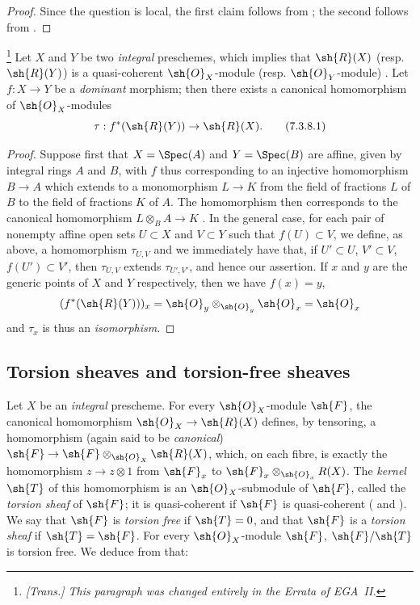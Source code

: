 \begin{proof}
Since the question is local, the first claim follows from ; the second follows from .
\end{proof}

\begin{env}[7.3.8]
\label{I.7.3.8}
\footnote{\emph{[Trans.] This paragraph was changed entirely in the Errata of EGA~II.}}
Let $X$ and $Y$ be two \emph{integral} preschemes, which implies that $\sh{R}(X)$ (resp. $\sh{R}(Y)$) is a quasi-coherent $\sh{O}_X$-module (resp. $\sh{O}_Y$-module) .
Let $f:X\to Y$ be a \emph{dominant} morphism; then there exists a canonical homomorphism of $\sh{O}_X$-modules
\[
\label{I.7.3.8.1}
  \tau:f^*(\sh{R}(Y))\to\sh{R}(X).
  \tag{7.3.8.1}
\]
\end{env}

\begin{proof}
Suppose first that $X=\Spec(A)$ and $Y=\Spec(B)$ are affine, given by integral rings $A$ and $B$, with $f$ thus corresponding to an injective homomorphism $B\to A$ which extends to a monomorphism $L\to K$ from the field of fractions $L$ of $B$ to the field of fractions $K$ of $A$.
The homomorphism  then corresponds to the canonical homomorphism $L\otimes_B A\to K$ .
In the general case, for each pair of nonempty affine open sets $U\subset X$ and $V\subset Y$ such that $f(U)\subset V$, we define, as above, a homomorphism $\tau_{U,V}$ and we immediately have that, if $U'\subset U$, $V'\subset V$, $f(U')\subset V'$, then $\tau_{U,V}$ extends $\tau_{U',V'}$, and hence our assertion.
If $x$ and $y$ are the generic points of $X$ and $Y$ respectively, then we have $f(x)=y$,
\[
  (f^*(\sh{R}(Y)))_x=\sh{O}_y\otimes_{\sh{O}_y}\sh{O}_x=\sh{O}_x
\]
 and $\tau_x$ is thus an \emph{isomorphism}.
\end{proof}

\subsection{Torsion sheaves and torsion-free sheaves}
\label{subsection:I.7.4}
\label{I.7.4}

\begin{env}[7.4.1]
\label{I.7.4.1}
Let $X$ be an \emph{integral} prescheme.
For every $\sh{O}_X$-module $\sh{F}$, the canonical homomorphism $\sh{O}_X\to\sh{R}(X)$ defines, by tensoring, a homomorphism (again said to be \emph{canonical}) $\sh{F}\to\sh{F}\otimes_{\sh{O}_X}\sh{R}(X)$, which, on each fibre, is exactly the homomorphism $z\to z\otimes1$ from $\sh{F}_x$ to $\sh{F}_x\otimes_{\sh{O}_x}R(X)$.
The \emph{kernel $\sh{T}$} of this homomorphism is an $\sh{O}_X$-submodule of $\sh{F}$, called the \emph{torsion sheaf} of $\sh{F}$; it is quasi-coherent if $\sh{F}$ is quasi-coherent ( and ).
We say that $\sh{F}$ is \emph{torsion free} if $\sh{T}=0$, and that $\sh{F}$ is a \emph{torsion sheaf} if $\sh{T}=\sh{F}$.
For every $\sh{O}_X$-module $\sh{F}$, $\sh{F}/\sh{T}$ is torsion free.
We deduce from  that:
\end{env}

